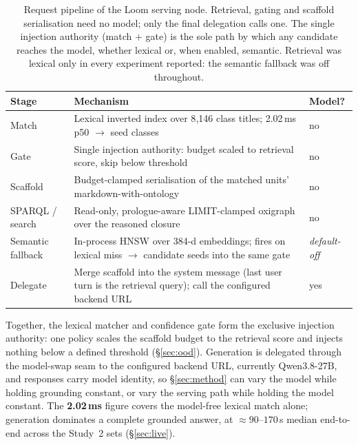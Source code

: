 \documentclass[10pt,twocolumn]{article}
\begin{document}
\begin{table}[t]\centering\small
\caption{Request pipeline of the Loom serving node. Retrieval, gating and scaffold serialisation
need no model; only the final delegation calls one. The single injection authority (match $+$ gate) is the sole path by
which any candidate reaches the model, whether lexical or, when enabled, semantic. Retrieval was
lexical only in every experiment reported: the semantic fallback was off throughout.}
\label{tab:pipeline}
\renewcommand{\arraystretch}{1.15}
\begin{tabularx}{\textwidth}{@{}>{\raggedright\arraybackslash}p{2.7cm} >{\raggedright\arraybackslash}X >{\centering\arraybackslash}p{2.2cm}@{}}
\toprule
Stage & Mechanism & Model? \\
\midrule
Match & Lexical inverted index over 8{,}146 class titles; 2.02\,ms p50 $\to$ seed classes & no \\
Gate & Single injection authority: budget scaled to retrieval score, skip below threshold & no \\
Scaffold & Budget-clamped serialisation of the matched units' markdown-with-ontology & no \\
SPARQL / search & Read-only, prologue-aware LIMIT-clamped oxigraph over the reasoned closure & no \\
Semantic fallback & In-process HNSW over 384-d embeddings; fires on lexical miss $\to$ candidate seeds into the same gate & \emph{default-off} \\
Delegate & Merge scaffold into the system message (last user turn is the retrieval query); call the configured backend URL & yes \\
\bottomrule
\end{tabularx}
\end{table}

Together, the lexical matcher and confidence gate form the exclusive injection authority: one policy scales the scaffold budget to the retrieval score and injects nothing below a defined threshold (\S\ref{sec:ood}). Generation is delegated through the model-swap seam to the configured backend URL, currently Qwen3.8-27B, and responses carry model identity, so \S\ref{sec:method} can vary the model while holding grounding constant, or vary the serving path while holding the model constant. The \textbf{2.02\,ms} figure covers the model-free lexical match alone; generation dominates a complete grounded answer, at $\approx90$--$170$\,s median end-to-end across the Study~2 sets (\S\ref{sec:live}).
\end{document}
